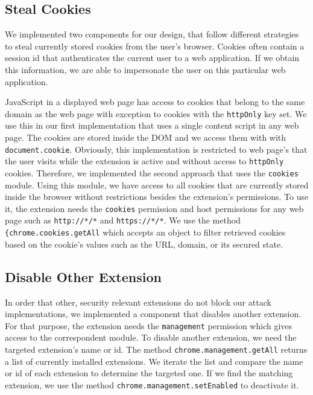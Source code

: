 \subsection{Steal Cookies}
\label{sec:stealCookies}

	We implemented two components for our design, that follow different strategies to steal currently stored cookies from the user's browser. Cookies often contain a session id that authenticates the current user to a web application. If we obtain this information, we are able to impersonate the user on this particular web application. 
	
	JavaScript in a displayed web page has access to cookies that belong to the same domain as the web page with exception to cookies with the \texttt{httpOnly} key set. We use this in our first implementation that uses a single content script in any web page. The cookies are stored inside the DOM and we access them with with \texttt{document.cookie}. Obviously, this implementation is restricted to web page's that the user visits while the extension is active and without access to \texttt{httpOnly} cookies. Therefore, we implemented the second approach that uses the \texttt{cookies} module. Using this module, we have access to all cookies that are currently stored inside the browser without restrictions besides the extension's permissions. To use it, the extension needs the \texttt{cookies} permission and host permissions for any web page such as \texttt{http://*/*} and \texttt{https://*/*}. We use the method \lstinline|{chrome.cookies.getAll| which accepts an object to filter retrieved cookies based on the cookie's values such as the URL, domain, or its secured state.

\subsection{Disable Other Extension}
\label{sec:disableOtherExtension}

	In order that other, security relevant extensions do not block our attack implementations, we implemented a component that disables another extension. For that purpose, the extension needs the \texttt{management} permission which gives access to the correspondent module. To disable another extension, we need the targeted extension's name or id.
	The method \lstinline|chrome.management.getAll| returns a list of currently installed extensions. We iterate the list and compare the name or id of each extension to determine the targeted one. If we find the matching extension, we use the method \lstinline|chrome.management.setEnabled| to deactivate it.

